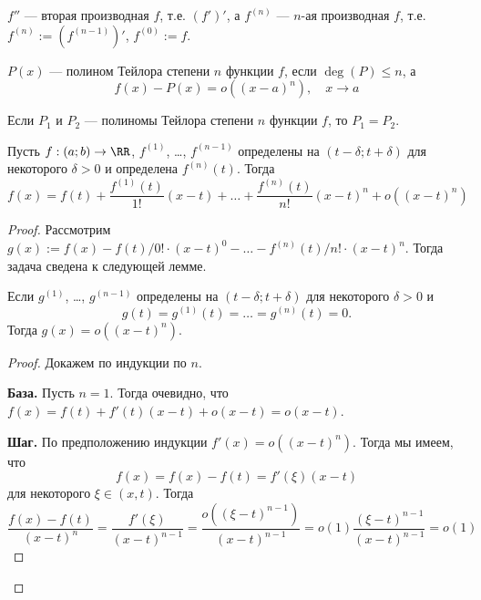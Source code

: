 \documentclass[12pt,a4paper]{article}
\begin{document}
    \begin{definition}
        $f''$ --- вторая производная $f$, т.е. $(f')'$, а $f^{(n)}$ --- $n$-ая производная $f$, т.е. $f^{(n)} := (f^{(n-1)})'$, $f^{(0)} := f$.
    \end{definition}

    \begin{definition}
        $P(x)$ --- полином Тейлора степени $n$ функции $f$, если $\deg(P) \leqslant n$, а
        \[f(x) - P(x) = o((x-a)^n),\quad x \to a\]
    \end{definition}

    \begin{theorem}
        Если $P_1$ и $P_2$ --- полиномы Тейлора степени $n$ функции $f$, то $P_1 = P_2$.
    \end{theorem}

    \begin{theorem}
        Пусть $f: (a; b) \to \RR$, $f^{(1)}$, \dots, $f^{(n-1)}$ определены на $(t-\delta; t+\delta)$ для некоторого $\delta > 0$ и определена $f^{(n)}(t)$. Тогда
        \[f(x) = f(t) + \frac{f^{(1)}(t)}{1!}(x-t) + \dots + \frac{f^{(n)}(t)}{n!}(x-t)^n + o((x-t)^n)\]
    \end{theorem}

    \begin{proof}
        Рассмотрим $g(x) := f(x) - f(t)/0! \cdot (x-t)^0 - \dots - f^{(n)}(t)/n! \cdot (x-t)^n$. Тогда задача сведена к следующей лемме.

        \begin{thlemma}
            Если $g^{(1)}$, \dots, $g^{(n-1)}$ определены на $(t-\delta; t+\delta)$ для некоторого $\delta > 0$ и
            \[g(t) = g^{(1)}(t) = \dots = g^{(n)}(t) = 0.\]
            Тогда $g(x) = o((x-t)^n)$.
        \end{thlemma}

        \begin{proof}
            Докажем по индукции по $n$.

            \textbf{База.} Пусть $n = 1$. Тогда очевидно, что $f(x) = f(t) + f'(t)(x-t) + o(x-t) = o(x-t)$.

            \textbf{Шаг.} По предположению индукции $f'(x) = o((x-t)^n)$. Тогда мы имеем, что
            \[f(x) = f(x) - f(t) = f'(\xi) (x - t)\]
            для некоторого $\xi \in (x, t)$. Тогда
            \[\frac{f(x) - f(t)}{(x-t)^n} = \frac{f'(\xi)}{(x-t)^{n-1}} = \frac{o((\xi-t)^{n-1})}{(x-t)^{n-1}} = o(1) \frac{(\xi - t)^{n-1}}{(x-t)^{n-1}} = o(1)\]
        \end{proof}
    \end{proof}
\end{document}
